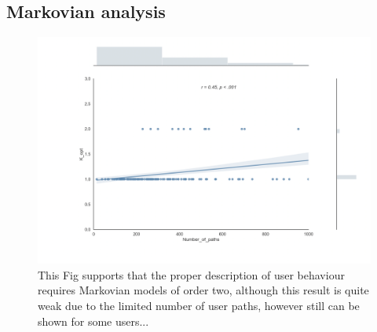\documentclass[fleqn,10pt]{wlscirep}
\begin{document}

\subsection*{Markovian analysis}

\begin{figure}[H]
\centering
\includegraphics[width=0.5\linewidth]{figs/kopt.png}
\caption{This Fig supports that the proper description of user behaviour requires Markovian models of order two, although this result is quite weak due to the limited number of user paths, however still can be shown for some users... }
\label{fig:kopt}
\end{figure}
\end{document}
